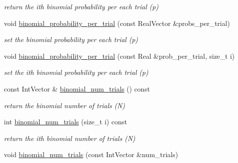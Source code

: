 \begin{DoxyCompactItemize}
\begin{DoxyCompactList}\small\item\em return the ith binomial probability per each trial (p) \end{DoxyCompactList}\item 
void \hyperlink{classPecos_1_1AleatoryDistParams_a3d2ff0f2914a7f210e5c9717ce9c6439}{binomial\+\_\+probability\+\_\+per\+\_\+trial} (const Real\+Vector \&probs\+\_\+per\+\_\+trial)\label{classPecos_1_1AleatoryDistParams_a3d2ff0f2914a7f210e5c9717ce9c6439}

\begin{DoxyCompactList}\small\item\em set the binomial probability per each trial (p) \end{DoxyCompactList}\item 
void \hyperlink{classPecos_1_1AleatoryDistParams_a73d3b3a1c00976c9b775f5da8710a34a}{binomial\+\_\+probability\+\_\+per\+\_\+trial} (const Real \&prob\+\_\+per\+\_\+trial, size\+\_\+t i)\label{classPecos_1_1AleatoryDistParams_a73d3b3a1c00976c9b775f5da8710a34a}

\begin{DoxyCompactList}\small\item\em set the ith binomial probability per each trial (p) \end{DoxyCompactList}\item 
const Int\+Vector \& \hyperlink{classPecos_1_1AleatoryDistParams_a415cd42566bfabdbc113ab6b06ef9651}{binomial\+\_\+num\+\_\+trials} () const \label{classPecos_1_1AleatoryDistParams_a415cd42566bfabdbc113ab6b06ef9651}

\begin{DoxyCompactList}\small\item\em return the binomial number of trials (N) \end{DoxyCompactList}\item 
int \hyperlink{classPecos_1_1AleatoryDistParams_a146fa5710d362e6206d982863e012bbc}{binomial\+\_\+num\+\_\+trials} (size\+\_\+t i) const \label{classPecos_1_1AleatoryDistParams_a146fa5710d362e6206d982863e012bbc}

\begin{DoxyCompactList}\small\item\em return the ith binomial number of trials (N) \end{DoxyCompactList}\item 
void \hyperlink{classPecos_1_1AleatoryDistParams_a954e2da82165b31d45a6acc52200790b}{binomial\+\_\+num\+\_\+trials} (const Int\+Vector \&num\+\_\+trials)\label{classPecos_1_1AleatoryDistParams_a954e2da82165b31d45a6acc52200790b}


\end{DoxyCompactItemize}
